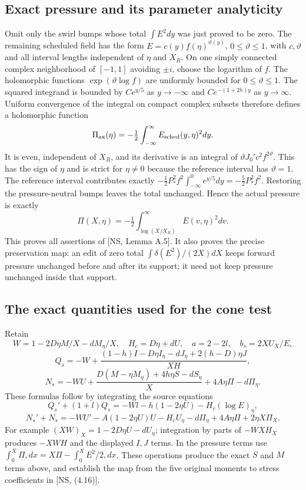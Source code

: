 \documentclass[10pt,a4paper]{article}
\begin{document}
\subsection{Exact pressure and its parameter analyticity}
Omit only the swirl bumps whose total $\int E^2dy$ was just proved to be zero.
The remaining scheduled field has the form $E=c(y)f(\eta)^{\vartheta(y)}$,
$0\le\vartheta\le1$, with $c,\vartheta$ and all interval lengths independent
of $\eta$ and $X_R$. On one simply connected complex neighborhood of $[-1,1]$
avoiding $\pm i$, choose the logarithm of $f$. The holomorphic functions
$\exp(\vartheta\log f)$ are uniformly bounded for $0\le\vartheta\le1$.
The squared integrand is bounded by $Ce^{y/5}$ as $y\to-\infty$ and
$Ce^{-(1+2h)y}$ as $y\to\infty$. Uniform convergence of the integral on
compact complex subsets therefore defines a holomorphic function
\[
\Pi_{\rm ax}(\eta)=-\tfrac12\int_{-\infty}^\infty E_{\rm sched}(y,\eta)^2dy.
\]
It is even, independent of $X_R$, and its derivative is an integral of
$\vartheta J_0'c^2f^{2\vartheta}$. This has the sign of $\eta$ and is
strict for $\eta\ne0$ because the reference interval has $\vartheta=1$.
The reference interval contributes exactly
$-\tfrac12P_*^2f^2\int_{-\infty}^0e^{y/5}dy=-\tfrac52P_*^2f^2$.
Restoring the pressure-neutral bumps leaves the total unchanged. Hence the
actual pressure is exactly
\[
\Pi(X,\eta)=-\tfrac12\int_{\log(X/X_R)}^\infty E(v,\eta)^2dv.
\]
This proves all assertions of [NS, Lemma A.5]. It also proves the precise
preservation map: an edit of zero total $\int\delta(E^2)/(2X)dX$ keeps
forward pressure unchanged before and after its support; it need not keep
pressure unchanged inside that support.

\subsection{The exact quantities used for the cone test}
Retain
\[
W=1-2D\eta M/X-dM_\eta/X,\quad H_c=D\eta+dU,
\quad a=2-2l,\quad b_s=2XU_X/E,
\]
\[
Q_s=-W+\frac{(1-h)I-D\eta I_\eta-dJ_\eta+2(h-D)\eta J}{XH},
\]
\[
N_s=-WU+\frac{D(M-\eta M_\eta)+4h\eta S-dS_\eta}{X}
+4A\eta\Pi-d\Pi_\eta.
\]
These formulas follow by integrating the source equations
\[
Q_s'+(1+l)Q_s=-Wl-h(1-2\eta U)-H_c(\log E)_\eta,
\]
\[
N_s'+N_s=-WU'-A(1-2\eta U)U-H_cU_\eta
-d\Pi_\eta+4A\eta\Pi+2\eta X\Pi_X.
\]
For example $(XW)_X=1-2D\eta U-dU_\eta$; integration by parts of
$-WXH_X$ produces $-XWH$ and the displayed $I,J$ terms. In the pressure
terms use $\int_0^X\Pi,dx=X\Pi-\int_0^XE^2/2,dx$.
These operations produce the exact $S$ and $M$ terms above, and establish the
map from the five original moments to stress coefficients in [NS, (4.16)].
\end{document}
